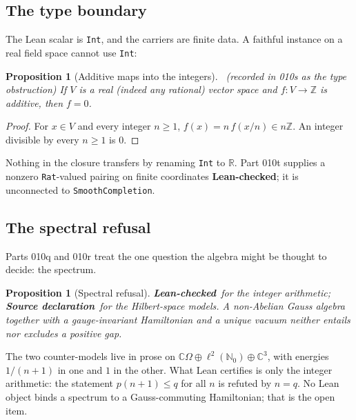 \documentclass[11pt,a4paper]{article}
\newcommand{\RR}{\mathbb{R}}\newcommand{\QQ}{\mathbb{Q}}\newcommand{\ZZ}{\mathbb{Z}}
\newcommand{\NN}{\mathbb{N}}\newcommand{\CC}{\mathbb{C}}
\newcommand{\bs}[1]{\texttt{#1}}
\newcommand{\st}[1]{\textsf{\small\textbf{#1}}}
\newcommand{\Slean}{\st{Lean-checked}}\newcommand{\Scond}{\st{Conditional}}
\newcommand{\Ssrc}{\st{Source declaration}}\newcommand{\Sint}{\st{Interface}}
\theoremstyle{plain}
\newtheorem{prop}[thm]{Proposition}
\theoremstyle{definition}
\theoremstyle{remark}
\begin{document}
\subsection{The type boundary}\label{sec:type}
The Lean scalar is \bs{Int}, and the carriers are finite data. A faithful instance on a real field space cannot use \bs{Int}:
\begin{prop}[Additive maps into the integers]\Sder\ \textit{(recorded in 010s as the type obstruction)}
If $V$ is a real (indeed any rational) vector space and $f:V\to\ZZ$ is additive, then $f=0$.
\end{prop}
\begin{proof}
For $x\in V$ and every integer $n\ge1$, $f(x)=n\,f(x/n)\in n\ZZ$. An integer divisible by every $n\ge1$ is $0$.
\end{proof}
Nothing in the closure transfers by renaming \bs{Int} to $\RR$. Part 010t supplies a nonzero \bs{Rat}-valued pairing on finite coordinates \Slean; it is unconnected to \bs{SmoothCompletion}.

\subsection{The spectral refusal}\label{sec:spectral}
Parts 010q and 010r treat the one question the algebra might be thought to decide: the spectrum.
\begin{prop}[Spectral refusal]\Slean\ for the integer arithmetic; \Ssrc\ for the Hilbert-space models.
A non-Abelian Gauss algebra together with a gauge-invariant Hamiltonian and a unique vacuum neither entails nor excludes a positive gap.
\end{prop}
The two counter-models live in prose on $\mathbb C\Omega\oplus\ell^2(\NN_0)\oplus\mathbb C^3$, with energies $1/(n+1)$ in one and $1$ in the other. What Lean certifies is only the integer arithmetic: the statement $p(n+1)\le q$ for all $n$ is refuted by $n=q$. No Lean object binds a spectrum to a Gauss-commuting Hamiltonian; that is the open item.
\end{document}
